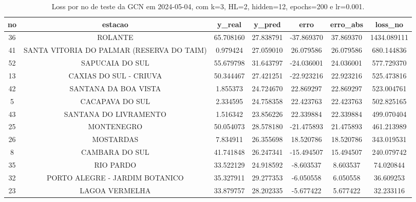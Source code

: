 \begin{table}[h]
\centering
\caption{Loss por no de teste da GCN em 2024-05-04, com k=3, HL=2, hidden=12, epochs=200 e lr=0.001.}
\label{tab:gcn_loss_k3_hl2_h12_e200_d20240504}
\begin{tabular}{ccccccc}
\toprule
no & estacao & y\_real & y\_pred & erro & erro\_abs & loss\_no \\
\midrule
36 & ROLANTE & 65.708160 & 27.838791 & -37.869370 & 37.869370 & 1434.089111 \\
41 & SANTA VITORIA DO PALMAR (RESERVA DO TAIM) & 0.979424 & 27.059010 & 26.079586 & 26.079586 & 680.144836 \\
52 & SAPUCAIA DO SUL & 55.679798 & 31.643797 & -24.036001 & 24.036001 & 577.729370 \\
13 & CAXIAS DO SUL - CRIUVA & 50.344467 & 27.421251 & -22.923216 & 22.923216 & 525.473816 \\
42 & SANTANA DA BOA VISTA & 1.855373 & 24.724670 & 22.869297 & 22.869297 & 523.004761 \\
5 & CACAPAVA DO SUL & 2.334595 & 24.758358 & 22.423763 & 22.423763 & 502.825165 \\
43 & SANTANA DO LIVRAMENTO & 1.516342 & 23.856226 & 22.339884 & 22.339884 & 499.070404 \\
25 & MONTENEGRO & 50.054073 & 28.578180 & -21.475893 & 21.475893 & 461.213989 \\
26 & MOSTARDAS & 7.834911 & 26.355698 & 18.520786 & 18.520786 & 343.019531 \\
8 & CAMBARA DO SUL & 41.741848 & 26.247341 & -15.494507 & 15.494507 & 240.079742 \\
35 & RIO PARDO & 33.522129 & 24.918592 & -8.603537 & 8.603537 & 74.020844 \\
32 & PORTO ALEGRE - JARDIM BOTANICO & 35.327911 & 29.277353 & -6.050558 & 6.050558 & 36.609253 \\
23 & LAGOA VERMELHA & 33.879757 & 28.202335 & -5.677422 & 5.677422 & 32.233116 \\
\bottomrule
\end{tabular}
\end{table}
